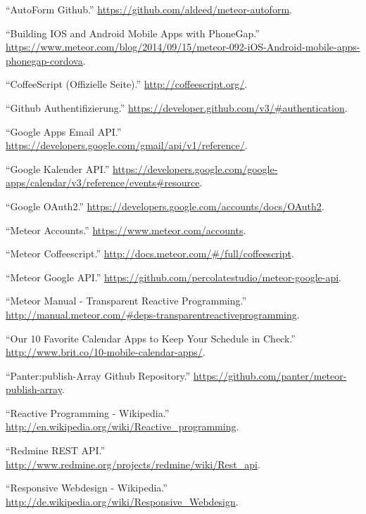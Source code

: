 \documentclass[]{article}
\begin{document}
``AutoForm Github.'' \url{https://github.com/aldeed/meteor-autoform}.

``Building IOS and Android Mobile Apps with PhoneGap.''
\url{https://www.meteor.com/blog/2014/09/15/meteor-092-iOS-Android-mobile-apps-phonegap-cordova}.

``CoffeeScript (Offizielle Seite).'' \url{http://coffeescript.org/}.

``Github Authentifizierung.''
\url{https://developer.github.com/v3/\#authentication}.

``Google Apps Email API.''
\url{https://developers.google.com/gmail/api/v1/reference/}.

``Google Kalender API.''
\url{https://developers.google.com/google-apps/calendar/v3/reference/events\#resource}.

``Google OAuth2.''
\url{https://developers.google.com/accounts/docs/OAuth2}.

``Meteor Accounts.'' \url{https://www.meteor.com/accounts}.

``Meteor Coffeescript.''
\url{http://docs.meteor.com/\#/full/coffeescript}.

``Meteor Google API.''
\url{https://github.com/percolatestudio/meteor-google-api}.

``Meteor Manual - Transparent Reactive Programming.''
\url{http://manual.meteor.com/\#deps-transparentreactiveprogramming}.

``Our 10 Favorite Calendar Apps to Keep Your Schedule in Check.''
\url{http://www.brit.co/10-mobile-calendar-apps/}.

``Panter:publish-Array Github Repository.''
\url{https://github.com/panter/meteor-publish-array}.

``Reactive Programming - Wikipedia.''
\url{http://en.wikipedia.org/wiki/Reactive_programming}.

``Redmine REST API.''
\url{http://www.redmine.org/projects/redmine/wiki/Rest_api}.

``Responsive Webdesign - Wikipedia.''
\url{http://de.wikipedia.org/wiki/Responsive_Webdesign}.
\end{document}
